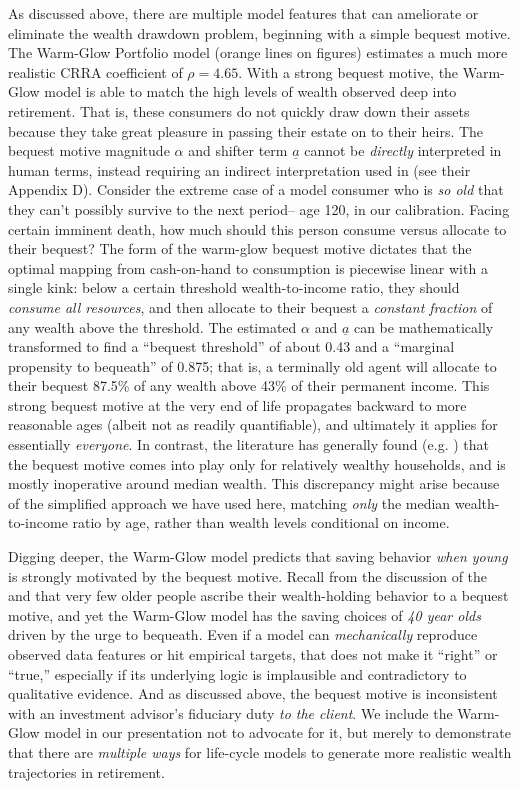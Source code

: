 \documentclass{article}
\newcommand{\CRRA}{\rho}
\begin{document}
As discussed above, there are multiple model features that can ameliorate or eliminate the wealth drawdown problem, beginning with a simple bequest motive.
The Warm-Glow Portfolio model (orange lines on figures) estimates a much more realistic CRRA coefficient of $\CRRA = 4.65$.
With a strong bequest motive, the Warm-Glow model is able to match the high levels of wealth observed deep into retirement.
That is, these consumers do not quickly draw down their assets because they take great pleasure in passing their estate on to their heirs.
The bequest motive magnitude $\alpha$ and shifter term $\underline{a}$ cannot be \textit{directly} interpreted in human terms, instead requiring an indirect interpretation used in \cite{DeNardi2010} (see their Appendix D).
Consider the extreme case of a model consumer who is \textit{so old} that they can't possibly survive to the next period-- age 120, in our calibration.
Facing certain imminent death, how much should this person consume versus allocate to their bequest?
The form of the warm-glow bequest motive dictates that the optimal mapping from cash-on-hand to consumption is piecewise linear with a single kink: below a certain threshold wealth-to-income ratio, they should \textit{consume all resources}, and then allocate to their bequest a \textit{constant fraction} of any wealth above the threshold.
The estimated $\alpha$ and $\underline{a}$ can be mathematically transformed to find a ``bequest threshold'' of about 0.43 and a ``marginal propensity to bequeath'' of 0.875; that is, a terminally old agent will allocate to their bequest 87.5\% of any wealth above 43\% of their permanent income.
This strong bequest motive at the very end of life propagates backward to more reasonable ages (albeit not as readily quantifiable), and ultimately it applies for essentially \textit{everyone}.
In contrast, the literature has generally found (e.g. \cite{deNardiBequest}) that the bequest motive comes into play only for relatively wealthy households, and is mostly inoperative around median wealth.
This discrepancy might arise because of the simplified approach we have used here, matching \textit{only} the median wealth-to-income ratio by age, rather than wealth levels conditional on income.

Digging deeper, the Warm-Glow model predicts that saving behavior \textit{when young} is strongly motivated by the bequest motive.
Recall from the discussion of the \cite{2023} and \cite{jaherGilded} that very few older people ascribe their wealth-holding behavior to a bequest motive, and yet the Warm-Glow model has the saving choices of \textit{40 year olds} driven by the urge to bequeath.
Even if a model can \textit{mechanically} reproduce observed data features or hit empirical targets, that does not make it ``right'' or ``true,'' especially if its underlying logic is implausible and contradictory to qualitative evidence.
And as discussed above, the bequest motive is inconsistent with an investment advisor's fiduciary duty \textit{to the client}.
We include the Warm-Glow model in our presentation not to advocate for it, but merely to demonstrate that there are \textit{multiple ways} for life-cycle models to generate more realistic wealth trajectories in retirement.
\end{document}

